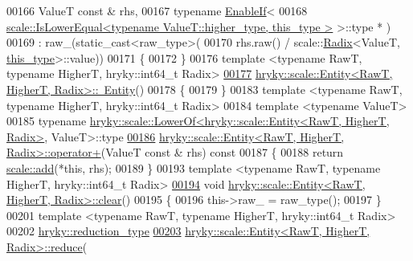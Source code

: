 \begin{DoxyCode}
00166     ValueT \textcolor{keyword}{const} & rhs,
00167     \textcolor{keyword}{typename} \hyperlink{classhryky_1_1_enable_if}{EnableIf}<
00168         \hyperlink{classhryky_1_1scale_1_1_is_lower_equal}{scale::IsLowerEqual<typename ValueT::higher_type, this_type >} >::type *
      )
00169     : raw\_(static\_cast<raw\_type>(
00170         rhs.raw() / scale::\hyperlink{classhryky_1_1scale_1_1_radix}{Radix}<ValueT, \hyperlink{classhryky_1_1scale_1_1_entity}{this_type}>::value))
00171 \{
00172 \}
00176 \textcolor{keyword}{template} <\textcolor{keyword}{typename} RawT, \textcolor{keyword}{typename} HigherT, hryky::\textcolor{keywordtype}{int}64\_t Radix>
\hypertarget{scale__entity_8h_source_l00177}{}\hyperlink{classhryky_1_1scale_1_1_entity_a80ab2b2ee794a72d1a56b1e918ed9d9f}{00177} \hyperlink{classhryky_1_1scale_1_1_entity}{hryky::scale::Entity<RawT, HigherT, Radix>::~Entity}()
00178 \{
00179 \}
00183 \textcolor{keyword}{template} <\textcolor{keyword}{typename} RawT, \textcolor{keyword}{typename} HigherT, hryky::\textcolor{keywordtype}{int}64\_t Radix>
00184 \textcolor{keyword}{template} <\textcolor{keyword}{typename} ValueT>
00185 \textcolor{keyword}{typename} \hyperlink{classhryky_1_1scale_1_1_lower_of}{hryky::scale::LowerOf<hryky::scale::Entity<RawT, HigherT, Radix>}, 
      ValueT>::type 
\hypertarget{scale__entity_8h_source_l00186}{}\hyperlink{classhryky_1_1scale_1_1_entity_a0e711f3283eab1061dc77c94bcb13ccf}{00186} \hyperlink{classhryky_1_1scale_1_1_entity}{hryky::scale::Entity<RawT, HigherT, Radix>::operator+}(ValueT \textcolor{keyword}{const} & rhs)\textcolor{keyword}{ const}
00187 \textcolor{keyword}{}\{
00188     \textcolor{keywordflow}{return} \hyperlink{namespacehryky_1_1scale_ac2fe4df99c737fa954907b456a705f75}{scale::add}(*\textcolor{keyword}{this}, rhs);
00189 \}
00193 \textcolor{keyword}{template} <\textcolor{keyword}{typename} RawT, \textcolor{keyword}{typename} HigherT, hryky::\textcolor{keywordtype}{int}64\_t Radix>
\hypertarget{scale__entity_8h_source_l00194}{}\hyperlink{classhryky_1_1scale_1_1_entity_ae0d0dd27d319afcc138de2c4dd733370}{00194} \textcolor{keywordtype}{void} \hyperlink{namespacehryky_aa201297ea9530da954a7230be71cc19d}{hryky::scale::Entity<RawT, HigherT, Radix>::clear}()
00195 \{
00196     this->raw\_ = raw\_type();
00197 \}
00201 \textcolor{keyword}{template} <\textcolor{keyword}{typename} RawT, \textcolor{keyword}{typename} HigherT, hryky::\textcolor{keywordtype}{int}64\_t Radix>
00202 \hyperlink{classhryky_1_1_intrusive_ptr}{hryky::reduction_type}
\hypertarget{scale__entity_8h_source_l00203}{}\hyperlink{classhryky_1_1scale_1_1_entity_aa745d5ef4401aa7f06ba72b91d06a3df}{00203} \hyperlink{namespacehryky_1_1scale_a6bbb1a80e433741768d3590c888ff644}{hryky::scale::Entity<RawT, HigherT, Radix>::reduce}(

\end{DoxyCode}
